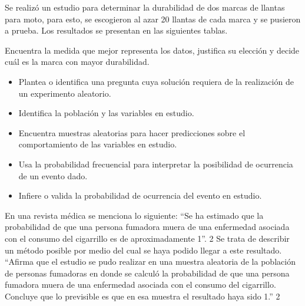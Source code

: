 \ejemplo

Se realizó un estudio para determinar la durabilidad de dos marcas de llantas para moto, para esto, se escogieron al azar 20 llantas de cada marca y se pusieron a prueba. Los resultados se presentan en las siguientes tablas.


Encuentra la medida que mejor representa los datos, justifica su elección y decide cuál es la marca con mayor durabilidad.


\evidencias

\begin{itemize}
  \item Plantea o identifica una pregunta cuya solución requiera de la realización de un experimento aleatorio.
  \item Identifica la población y las variables en estudio.
  \item Encuentra muestras aleatorias para hacer predicciones sobre el comportamiento de las variables en estudio.
  \item Usa la probabilidad frecuencial para interpretar la posibilidad de ocurrencia de un evento dado.
  \item Infiere o valida la probabilidad de ocurrencia del evento en estudio.
\end{itemize}

\ejemplo

En una revista médica se menciona lo siguiente: “Se ha estimado que la probabilidad de que una persona fumadora muera de una enfermedad asociada con el consumo del cigarrillo es de aproximadamente 1”. 2 Se trata de describir un método posible por medio del cual se haya podido llegar a este resultado. “Afirma que el estudio se pudo realizar en una muestra aleatoria de la población de personas fumadoras en donde se calculó la probabilidad de que una persona fumadora muera de una enfermedad asociada con el consumo del cigarrillo. Concluye que lo previsible es que en esa muestra el resultado haya sido 1.” 2

